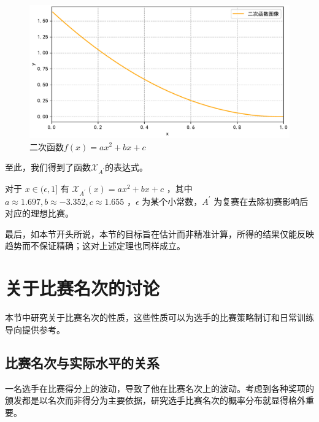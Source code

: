         \begin{figure}[htbp]
            \centering
            \includegraphics[width=\textwidth]{fig/plottingQuadFuncOfXAprime.pdf}
            \caption{二次函数$f(x)=ax^2+bx+c$}
            \label{fig:quadFuncOfXAprime}
        \end{figure}

        至此，我们得到了函数$\mathcal{X}_{A^\prime}$的表达式。

        \begin{theorem}
            对于 $x\in(\epsilon,1]$ 有 $\mathcal{X}_{A^\prime}(x)=ax^2+bx+c$ ，其中 $a\approx 1.697,b\approx -3.352,c\approx 1.655$ ，$\epsilon$ 为某个小常数，$A^\prime$ 为复赛在去除初赛影响后对应的理想比赛。

            \label{thm:formulaforXAprime}
        \end{theorem}

        最后，如本节开头所说，本节的目标旨在估计而非精准计算，所得的结果仅能反映趋势而不保证精确；这对上述定理也同样成立。

\section{关于比赛名次的讨论}

    本节中研究关于比赛名次的性质，这些性质可以为选手的比赛策略制订和日常训练导向提供参考。

    \subsection{比赛名次与实际水平的关系}\label{sec:relationBetweenCapabilityAndRanking}

        一名选手在比赛得分上的波动，导致了他在比赛名次上的波动。考虑到各种奖项的颁发都是以名次而非得分为主要依据，研究选手比赛名次的概率分布就显得格外重要。
        
